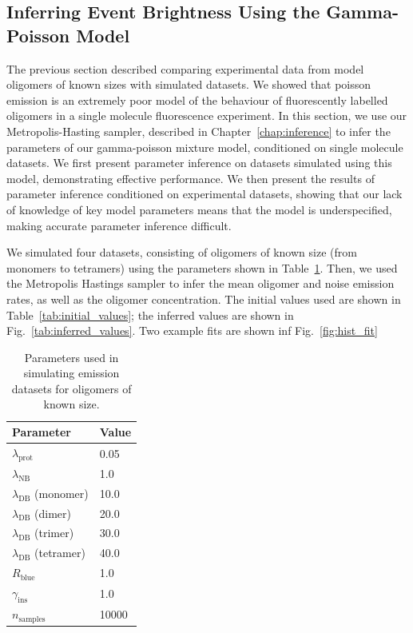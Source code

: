 \subsection{Inferring Event Brightness Using the Gamma-Poisson Model}
The previous section described comparing experimental data from model oligomers of known sizes with simulated datasets. We showed that poisson emission is an extremely poor model of the behaviour of fluorescently labelled oligomers in a single molecule fluorescence experiment. In this section, we use our Metropolis-Hasting sampler, described in Chapter~\autoref{chap:inference} to infer the parameters of our gamma-poisson mixture model, conditioned on single molecule datasets. We first present parameter inference on datasets simulated using this model, demonstrating effective performance. We then present the results of parameter inference conditioned on experimental datasets, showing that our lack of knowledge of key model parameters means that the model is underspecified, making accurate parameter inference difficult.

We simulated four datasets, consisting of oligomers of known size (from monomers to tetramers) using the parameters shown in Table~\ref{tab:oligomer_params}. Then, we used the Metropolis Hastings sampler to infer the mean oligomer and noise emission rates, as well as the oligomer concentration. The initial values used are shown in Table~\ref{tab:initial_values}; the inferred values are shown in Fig.~\ref{tab:inferred_values}. Two example fits are shown inf Fig.~\ref{fig:hist_fit}

\begin{center}
\begin{table}[!ht]
\begin{tabular}{|l|l|}
\hline
{\bf Parameter} & {\bf Value}\\ \hline
$\lambda_{\text{prot}}$ & 0.05\\
$\lambda_{\text{NB}}$ & 1.0\\
$\lambda_{\text{DB}}$ (monomer) & 10.0\\
$\lambda_{\text{DB}}$ (dimer) & 20.0\\
$\lambda_{\text{DB}}$ (trimer) & 30.0\\
$\lambda_{\text{DB}}$ (tetramer) & 40.0\\
$R_{\text{blue}}$ & 1.0\\
$\gamma_{\text{ins}}$ & 1.0\\
$n_{\text{samples}}$ & 10000\\ \hline
\end{tabular}
\caption{Parameters used in simulating emission datasets for oligomers of known size.}
\label{tab:oligomer_params}
\end{table}
\end{center}


